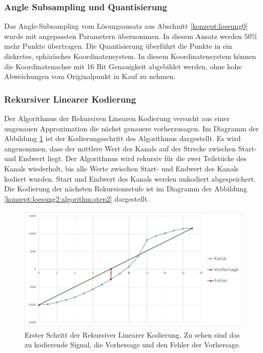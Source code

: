 \subsubsection{Angle Subsampling und Quantisierung}
Das Angle-Subsampling vom Lösungsansatz aus Abschnitt \ref{konzept:loesung0} wurde mit angepassten Parametern übernommen. In diesem Ansatz werden $50\%$ mehr Punkte übertragen. Die Quantisierung überführt die Punkte in ein diskretes, sphärisches Koordinatensystem. In diesem Koordinatensystem können die Koordinatenachse mit 16 Bit Genauigkeit abgebildet werden, ohne hohe Abweichungen vom Originalpunkt in Kauf zu nehmen.

\subsubsection{Rekursiver Linearer Kodierung}
Der Algorithmus der Rekursiven Linearen Kodierung versucht aus einer ungenauen Approximation die nächst genauere vorherzusagen. Im Diagramm der Abbildung \ref{konzept:loesung2:algorithm:step1} ist der Kodierungsschritt des Algorithmus dargestellt. Es wird angenommen, dass der mittlere Wert des Kanals auf der Strecke zwischen Start- und Endwert liegt. Der Algorithmus wird rekursiv für die zwei Teilstücke des Kanals wiederholt, bis alle Werte zwischen Start- und Endwert des Kanals kodiert wurden. Start und Endwert des Kanals werden unkodiert abgespeichert. Die Kodierung der nächsten Rekursionsstufe ist im Diagramm der Abbildung \ref{konzept:loesung2:algorithm:step2} dargestellt.
\begin{figure}[!htbp]
	\center
	\includegraphics[width=1\textwidth,height=6cm,keepaspectratio]{./pictures/konzept/solution2/algorithm_step1.png}
	\caption{Erster Schritt der Rekursiver Linearer Kodierung. Zu sehen sind das zu kodierende Signal, die Vorhersage und den Fehler der Vorhersage.}
	\label{konzept:loesung2:algorithm:step1}
\end{figure} 
